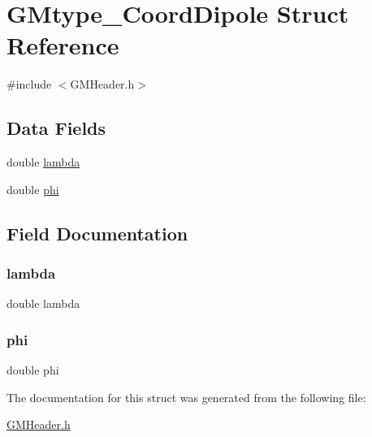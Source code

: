 \hypertarget{struct_g_mtype___coord_dipole}{}\section{G\+Mtype\+\_\+\+Coord\+Dipole Struct Reference}
\label{struct_g_mtype___coord_dipole}


{\ttfamily \#include $<$G\+M\+Header.\+h$>$}

\subsection*{Data Fields}
\begin{DoxyCompactItemize}
\item 
double \mbox{\hyperlink{struct_g_mtype___coord_dipole_a3db359547eed8cfd48ca821d95f577af}{lambda}}
\item 
double \mbox{\hyperlink{struct_g_mtype___coord_dipole_adae8d8a6ff28515e505bb1c07f2b33c8}{phi}}
\end{DoxyCompactItemize}


\subsection{Field Documentation}
\mbox{\label{struct_g_mtype___coord_dipole_a3db359547eed8cfd48ca821d95f577af}} 
\subsubsection{\texorpdfstring{lambda}{lambda}}
{\footnotesize\ttfamily double lambda}

\mbox{\label{struct_g_mtype___coord_dipole_adae8d8a6ff28515e505bb1c07f2b33c8}} 
\subsubsection{\texorpdfstring{phi}{phi}}
{\footnotesize\ttfamily double phi}



The documentation for this struct was generated from the following file\+:\begin{DoxyCompactItemize}
\item 
\mbox{\hyperlink{_g_m_header_8h}{G\+M\+Header.\+h}}\end{DoxyCompactItemize}
